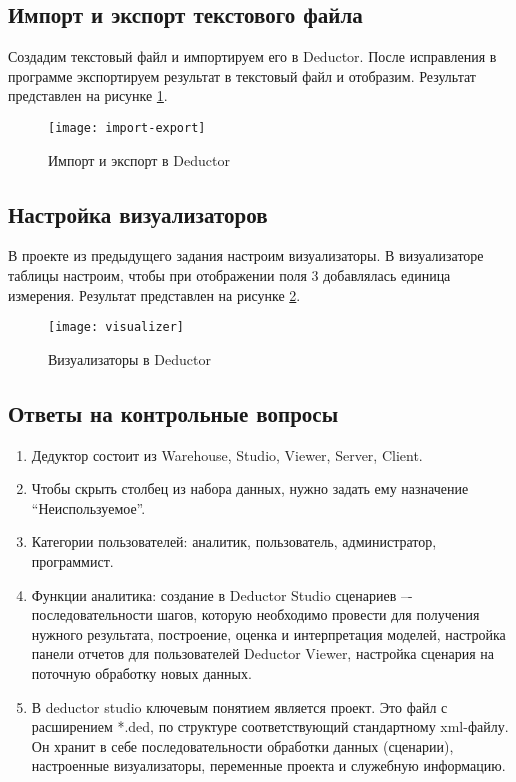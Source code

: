 \documentclass[a4paper,14pt]{extarticle}
\begin{document}
\subsection{Импорт и экспорт текстового файла}
Создадим текстовый файл и импортируем его в Deductor. После исправления в
программе экспортируем результат в текстовый файл и отобразим. Результат
представлен на рисунке \ref{fig:import-export}.
\begin{figure}[H]
    \centering
    \texttt{[image: import-export]}
    \caption{Импорт и экспорт в Deductor}
    \label{fig:import-export}
\end{figure}

\subsection{Настройка визуализаторов}
В проекте из предыдущего задания настроим визуализаторы. В визуализаторе таблицы
настроим, чтобы при отображении поля 3 добавлялась единица измерения. Результат
представлен на рисунке \ref{fig:visualizer}.
\begin{figure}[H]
    \centering
    \texttt{[image: visualizer]}
    \caption{Визуализаторы в Deductor}
    \label{fig:visualizer}
\end{figure}

\subsection{Ответы на контрольные вопросы}
\begin{enumerate}
    \item Дедуктор состоит из Warehouse, Studio, Viewer, Server, Client.
    \item Чтобы скрыть столбец из набора данных, нужно задать ему назначение
          \enquote{Неиспользуемое}.
    \item Категории пользователей: аналитик, пользователь, администратор,
          программист.
    \item Функции аналитика: создание в Deductor Studio сценариев –-
          последовательности шагов, которую необходимо провести для получения нужного
          результата, построение, оценка и интерпретация моделей, настройка панели
          отчетов для пользователей Deductor Viewer, настройка сценария на поточную
          обработку новых данных.
    \item В deductor studio ключевым понятием является проект. Это файл с
          расширением *.ded, по структуре соответствующий стандартному xml-файлу. Он
          хранит в себе последовательности обработки данных (сценарии),
          настроенные визуализаторы, переменные проекта и служебную информацию.
\end{enumerate}
\end{document}
